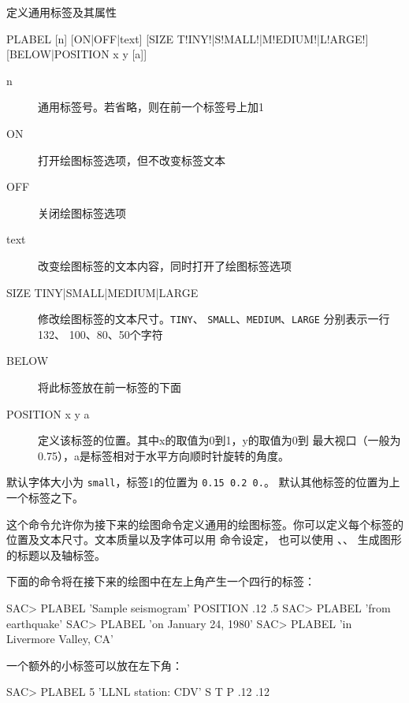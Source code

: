 \label{cmd:plabel}

定义通用标签及其属性

\begin{SACSTX}
PLABEL [n] [ON|OFF|text] [SIZE T!INY!|S!MALL!|M!EDIUM!|L!ARGE!]
    [BELOW|POSITION x y [a]]
\end{SACSTX}

\begin{description}
\item [n] 通用标签号。若省略，则在前一个标签号上加1
\item [ON] 打开绘图标签选项，但不改变标签文本
\item [OFF] 关闭绘图标签选项
\item [text] 改变绘图标签的文本内容，同时打开了绘图标签选项
\item [SIZE TINY|SMALL|MEDIUM|LARGE] 修改绘图标签的文本尺寸。\texttt{TINY}、
    \texttt{SMALL}、\texttt{MEDIUM}、\texttt{LARGE} 分别表示一行132、
    100、80、50个字符
\item [BELOW] 将此标签放在前一标签的下面
\item [POSITION x y a] 定义该标签的位置。其中x的取值为0到1，y的取值为0到
    最大视口（一般为0.75），a是标签相对于水平方向顺时针旋转的角度。
\end{description}

默认字体大小为 \texttt{small}，标签1的位置为 \texttt{0.15 0.2 0.}。
默认其他标签的位置为上一个标签之下。

这个命令允许你为接下来的绘图命令定义通用的绘图标签。你可以定义每个标签的
位置及文本尺寸。文本质量以及字体可以用  命令设定，
也可以使用 、、
生成图形的标题以及轴标签。

下面的命令将在接下来的绘图中在左上角产生一个四行的标签：
\begin{SACCode}
SAC> PLABEL 'Sample seismogram' POSITION .12 .5
SAC> PLABEL 'from earthquake'
SAC> PLABEL 'on January 24, 1980'
SAC> PLABEL 'in Livermore Valley, CA'
\end{SACCode}

一个额外的小标签可以放在左下角：
\begin{SACCode}
SAC> PLABEL 5 'LLNL station: CDV' S T P .12 .12
\end{SACCode}
